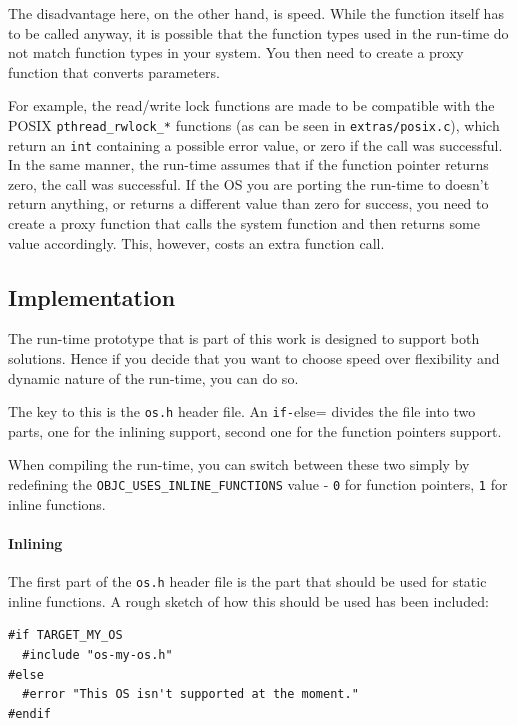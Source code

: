 The disadvantage here, on the other hand, is speed. While the function itself has to be called anyway, it is possible that the function types used in the run-time do not match function types in your system. You then need to create a proxy function that converts parameters.

For example, the read/write lock functions are made to be compatible with the POSIX \verb=pthread_rwlock_*= functions (as can be seen in \verb=extras/posix.c=), which return an \verb=int= containing a possible error value, or zero if the call was successful. In the same manner, the run-time assumes that if the function pointer returns zero, the call was successful. If the OS you are porting the run-time to doesn't return anything, or returns a different value than zero for success, you need to create a proxy function that calls the system function and then returns some value accordingly. This, however, costs an extra function call.

\subsection{Implementation}

The run-time prototype that is part of this work is designed to support both solutions. Hence if you decide that you want to choose speed over flexibility and dynamic nature of the run-time, you can do so.

The key to this is the \verb=os.h= header file. An \verb#if-#else= divides the file into two parts, one for the inlining support, second one for the function pointers support.

When compiling the run-time, you can switch between these two simply by redefining the \verb=OBJC_USES_INLINE_FUNCTIONS= value - \verb=0= for function pointers, \verb=1= for inline functions.

\paragraph{Inlining}

The first part of the \verb=os.h= header file is the part that should be used for static inline functions. A rough sketch of how this should be used has been included:

\begin{verbatim}
#if TARGET_MY_OS
  #include "os-my-os.h"
#else
  #error "This OS isn't supported at the moment."
#endif
\end{verbatim}

